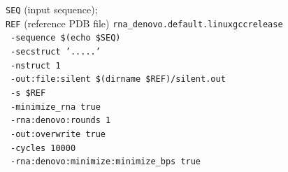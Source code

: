 \begin{algorithm}[H]
  \caption{Reference conformation preparation with FARFAR2}
  \label{ch6:alg:farfar-minimise}
  \begin{algorithmic}[1]
    \REQUIRE \texttt{SEQ} (input sequence);\\
    \texttt{REF} (reference PDB file)
    \STATE \texttt{rna\_denovo.default.linuxgccrelease} \\
    \ \texttt{-sequence \$(echo \$SEQ)}  \\[-0.2em]
    \ \texttt{-secstruct '.....'}  \\[-0.2em]
    \ \texttt{-nstruct 1} \\[-0.2em]
    \ \texttt{-out:file:silent \$(dirname \$REF)/silent.out} \\[-0.2em]
    \ \texttt{-s \$REF}  \\[-0.2em]
    \ \texttt{-minimize\_rna true} \\[-0.2em]
    \ \texttt{-rna:denovo:rounds 1} \\[-0.2em]
    \ \texttt{-out:overwrite true} \\[-0.2em]
    \ \texttt{-cycles 10000} \\[-0.2em]
    \ \texttt{-rna:denovo:minimize:minimize\_bps true}
  \end{algorithmic}
\end{algorithm}

